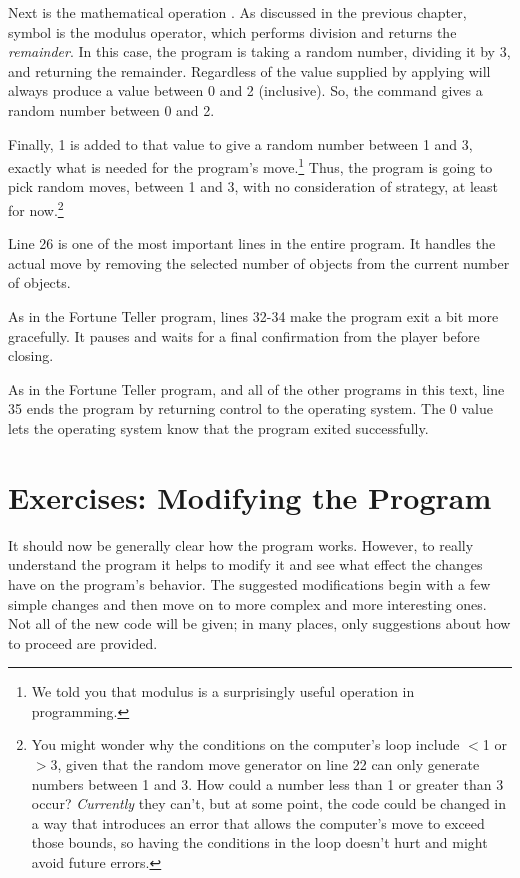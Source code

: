 Next is the mathematical operation .  As discussed in the previous chapter, \cf{\%} symbol is the modulus operator, which performs division and returns the \emph{remainder}.   
In this case, the program is taking a random number, dividing it by $3$, and returning the remainder.  Regardless of the value supplied by  applying  will always produce a value between 0 and 2 (inclusive).  So, the command 
gives a random number between 0 and 2.  

Finally, 1 is added to that value to give a random number between 1 and 3, exactly what is needed for the program's move.\footnote{We told you that modulus is a surprisingly useful operation in programming.}  Thus, the program is going to pick random moves, between 1 and 3, with no consideration of strategy, at least for now.\footnote{You might wonder why the conditions on the computer's  loop include $<$1 or $>$3, given that the random move generator on line 22 can only generate numbers between 1 and 3.  How could a number less than 1 or greater than 3 occur?  \emph{Currently} they can't, but at some point, the code could be changed in a way that introduces an error that allows the computer's move to exceed those bounds, so having the conditions in the loop doesn't hurt and might avoid future errors.}

Line 26 is one of the most important lines in the entire program.  It handles the actual move by removing the selected number of objects from the current number of objects.  


As in the Fortune Teller program, lines 32-34 make the program exit a bit more gracefully.  It pauses and waits for a final confirmation from the player before closing.  

As in the Fortune Teller program, and all of the other programs in this text, line 35 ends the program by returning control to the operating system.  The 0 value lets the operating system know that the program exited successfully.  

\vspace{+0.25cm}
{\color{\mycolor}\noindent\hrulefill}
\section{Exercises: Modifying the Program}
It should now be generally clear how the program works.  However, to really understand the program it helps to modify it and see what effect the changes have on the program's behavior.  The suggested modifications begin with a few simple changes and then move on to more complex and more interesting ones.  Not all of the new code will be given; in many places, only suggestions about how to proceed are provided.


